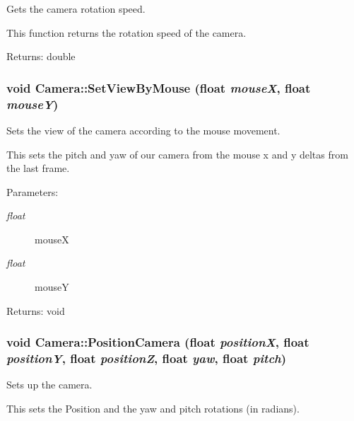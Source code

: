 Gets the camera rotation speed. 

This function returns the rotation speed of the camera.

\begin{Desc}
\item[Returns:]double \end{Desc}
\hypertarget{class_camera_05c4a137b939bfdee2b7efea6d67d0e7}{
\subsubsection[SetViewByMouse]{\setlength{\rightskip}{0pt plus 5cm}void Camera::SetViewByMouse (float {\em mouseX}, \/  float {\em mouseY})}}
\label{class_camera_05c4a137b939bfdee2b7efea6d67d0e7}


Sets the view of the camera according to the mouse movement. 

This sets the pitch and yaw of our camera from the mouse x and y deltas from the last frame.

\begin{Desc}
\item[Parameters:]
\begin{description}
\item[{\em float}]mouseX \item[{\em float}]mouseY \end{description}
\end{Desc}
\begin{Desc}
\item[Returns:]void \end{Desc}
\hypertarget{class_camera_e32a72f519739a0b4dce07433cfbe9ef}{
\subsubsection[PositionCamera]{\setlength{\rightskip}{0pt plus 5cm}void Camera::PositionCamera (float {\em positionX}, \/  float {\em positionY}, \/  float {\em positionZ}, \/  float {\em yaw}, \/  float {\em pitch})}}
\label{class_camera_e32a72f519739a0b4dce07433cfbe9ef}


Sets up the camera. 

This sets the Position and the yaw and pitch rotations (in radians).

